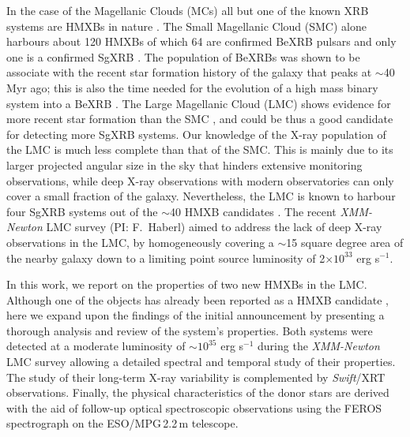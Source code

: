 \documentclass[a4paper,fleqn,usenatbib]{mnras}
\newcommand{\ergs}[1]{$\times 10^{#1}$ erg s$^{-1}$}
\newcommand{\oergs}[1]{$10^{#1}$ erg s$^{-1}$}
\newcommand{\swift}{{\it Swift}\xspace}
\newcommand{\xmm}{{\it XMM-Newton}\xspace}
\begin{document}
In the case of the Magellanic Clouds (MCs)  all but one of the known XRB systems \citep[i.e. LMC\,X-2 is low-mass X-ray binary][]{2003ApJ...590.1035S} are HMXBs in nature \citep[e.g.][]{2010ApJ...716L.140A,2016MNRAS.459..528A}. The Small Magellanic Cloud (SMC) alone harbours about 120 HMXBs of which 64 are confirmed BeXRB pulsars and only one is a confirmed SgXRB \citep{2016A&A...586A..81H,2017MNRAS.470.4354V,2014MNRAS.438.2005M}. The population of BeXRBs was shown to be associate with the recent star formation history of the galaxy that peaks at $\sim$40\,Myr ago; this is also the time needed for the evolution of a high mass binary system into a BeXRB \citep{2010ApJ...716L.140A}.  
The Large Magellanic Cloud (LMC) shows evidence for more recent star formation than the SMC \citep{2009AJ....138.1243H}, and  could be thus a good candidate for detecting more SgXRB systems. 
Our knowledge of the X-ray population of the LMC is much less complete than that of the SMC. 
% 
This is mainly due to its larger projected angular size in the sky that hinders extensive monitoring observations, while deep X-ray observations with modern observatories can only cover a small fraction of the galaxy.
Nevertheless, the LMC is known to harbour four SgXRB systems out of the $\sim$40 HMXB candidates \citep{2016MNRAS.459..528A}.
The recent \xmm LMC survey (PI: F.~Haberl) aimed to address the lack of deep X-ray observations in the LMC, by homogeneously covering a $\sim$15 square degree area of the nearby galaxy down to a limiting point source luminosity of 2\ergs{33}.

In this work, we report on the properties of two new HMXBs in the LMC. 
Although one of the objects has already been reported as a HMXB candidate \citep[][]{2012ATel.3993....1S}, here we expand upon the findings of the initial announcement by presenting a thorough analysis and review of the system's properties.
Both systems were detected at a moderate luminosity of $\sim$\oergs{35} during the \xmm LMC survey allowing a detailed spectral and temporal study of their properties.  
The study of their long-term X-ray variability is complemented by \swift/XRT observations.
Finally, the physical characteristics of the donor stars are derived with the aid of follow-up optical spectroscopic observations using the FEROS spectrograph on the ESO/MPG\,2.2\,m telescope.



\end{document}
